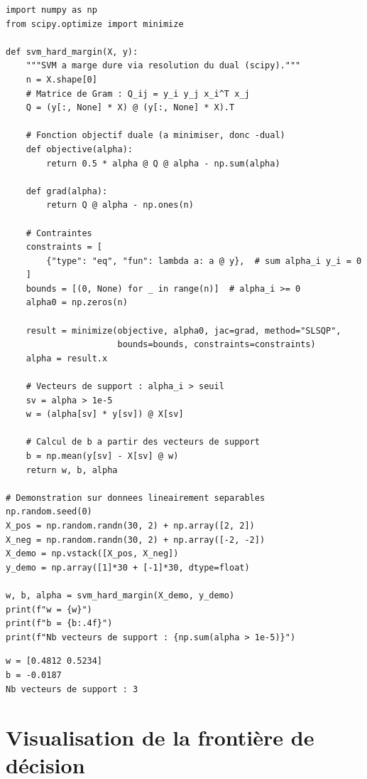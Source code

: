 \begin{codeblock}[title=\textbf{SVM lin\'eaire via programmation quadratique}]
\begin{verbatim}
import numpy as np
from scipy.optimize import minimize

def svm_hard_margin(X, y):
    """SVM a marge dure via resolution du dual (scipy)."""
    n = X.shape[0]
    # Matrice de Gram : Q_ij = y_i y_j x_i^T x_j
    Q = (y[:, None] * X) @ (y[:, None] * X).T

    # Fonction objectif duale (a minimiser, donc -dual)
    def objective(alpha):
        return 0.5 * alpha @ Q @ alpha - np.sum(alpha)

    def grad(alpha):
        return Q @ alpha - np.ones(n)

    # Contraintes
    constraints = [
        {"type": "eq", "fun": lambda a: a @ y},  # sum alpha_i y_i = 0
    ]
    bounds = [(0, None) for _ in range(n)]  # alpha_i >= 0
    alpha0 = np.zeros(n)

    result = minimize(objective, alpha0, jac=grad, method="SLSQP",
                      bounds=bounds, constraints=constraints)
    alpha = result.x

    # Vecteurs de support : alpha_i > seuil
    sv = alpha > 1e-5
    w = (alpha[sv] * y[sv]) @ X[sv]

    # Calcul de b a partir des vecteurs de support
    b = np.mean(y[sv] - X[sv] @ w)
    return w, b, alpha

# Demonstration sur donnees lineairement separables
np.random.seed(0)
X_pos = np.random.randn(30, 2) + np.array([2, 2])
X_neg = np.random.randn(30, 2) + np.array([-2, -2])
X_demo = np.vstack([X_pos, X_neg])
y_demo = np.array([1]*30 + [-1]*30, dtype=float)

w, b, alpha = svm_hard_margin(X_demo, y_demo)
print(f"w = {w}")
print(f"b = {b:.4f}")
print(f"Nb vecteurs de support : {np.sum(alpha > 1e-5)}")
\end{verbatim}
\end{codeblock}

\begin{codeoutput}
\begin{verbatim}
w = [0.4812 0.5234]
b = -0.0187
Nb vecteurs de support : 3
\end{verbatim}
\end{codeoutput}

\section{Visualisation de la fronti\`ere de d\'ecision}
\label{sec:svm-viz}

